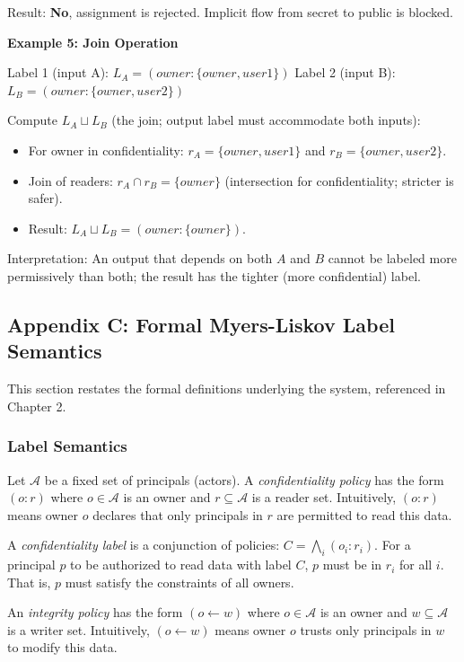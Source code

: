 Result: \textbf{No}, assignment is rejected. Implicit flow from secret to public is blocked.

\textbf{Example 5: Join Operation}

Label 1 (input A): $L_A = (owner:\{owner,user1\})$
Label 2 (input B): $L_B = (owner:\{owner,user2\})$

Compute $L_A \sqcup L_B$ (the join; output label must accommodate both inputs):

\begin{itemize}
    \item For owner in confidentiality: $r_A = \{owner, user1\}$ and $r_B = \{owner, user2\}$.
    \item Join of readers: $r_A \cap r_B = \{owner\}$ (intersection for confidentiality; stricter is safer).
    \item Result: $L_A \sqcup L_B = (owner:\{owner\})$.
\end{itemize}

Interpretation: An output that depends on both $A$ and $B$ cannot be labeled more permissively than both; the result has the tighter (more confidential) label.

\subsection{Appendix C: Formal Myers-Liskov Label Semantics}

This section restates the formal definitions underlying the system, referenced in Chapter 2.

\subsubsection*{Label Semantics}

Let $\mathcal{A}$ be a fixed set of principals (actors). A \emph{confidentiality policy} has the form $(o:r)$ where $o \in \mathcal{A}$ is an owner and $r \subseteq \mathcal{A}$ is a reader set. Intuitively, $(o:r)$ means owner $o$ declares that only principals in $r$ are permitted to read this data.

A \emph{confidentiality label} is a conjunction of policies: $C = \bigwedge_i (o_i:r_i)$. For a principal $p$ to be authorized to read data with label $C$, $p$ must be in $r_i$ for all $i$. That is, $p$ must satisfy the constraints of all owners.

An \emph{integrity policy} has the form $(o \leftarrow w)$ where $o \in \mathcal{A}$ is an owner and $w \subseteq \mathcal{A}$ is a writer set. Intuitively, $(o \leftarrow w)$ means owner $o$ trusts only principals in $w$ to modify this data.

